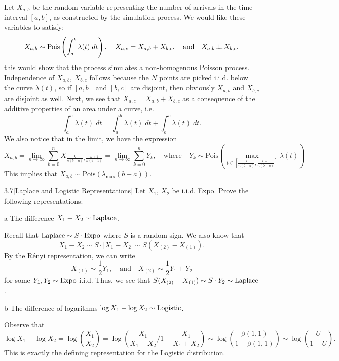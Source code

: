 \documentclass{pset}
\begin{document}
\begin{solution}
  Let $X_{a,b}$ be the random variable representing the number of arrivals in the time interval $[a,b]$, as constructed by the simulation process. We would like these variables to satisfy:
  \[X_{a,b} \sim \textrm{Pois}\left(\int_a^b \lambda(t) \;dt\right),\quad X_{a,c}=X_{a,b}+X_{b,c},\quad\textrm{and} \quad X_{a,b}\!\perp\!\!\!\perp\! X_{b, c},\]
  this would show that the process simulates a non-homogenous Poisson process. Independence of $X_{a,b}$, $X_{b,c}$ follows because the $N$ points are picked i.i.d. below the curve $\lambda(t)$, so if $[a,b]$ and $[b,c]$ are disjoint, then obviously $X_{a,b}$ and $X_{b,c}$ are disjoint as well. Next, we see that $X_{a,c} = X_{a,b} + X_{b,c}$ as a consequence of the additive properties of an area under a curve, i.e.
  \[
    \int_{a}^c \lambda(t)\;dt = \int_a^b \lambda(t)\;dt + \int_b^c \lambda(t)\;dt.
  \]
  We also notice that in the limit, we have the expression
  \[
    X_{a,b} = \lim_{n\to \infty} \sum^n_{k=0} X_{\frac{k}{n(b-a)}, \frac{k+1}{n(b-1)}} = \lim_{n\to \infty} \sum^n_{k=0} Y_k,\quad \textrm{where}\quad Y_k\sim \textrm{Pois}\left(\max_{t\in \left[\frac{k}{n(b-a)}, \frac{k+1}{n(b-a)}\right]}\lambda(t)\right)
  \]
  This implies that $X_{a,b}\sim \textrm{Pois}(\lambda_{\textrm{max}} ( b-a))$.
\end{solution}

\begin{problem}{3.7}[Laplace and Logistic Representations]
  Let $X_1$, $X_2$ be i.i.d. Expo. Prove the following representations:
\end{problem}

\begin{parts}
  \begin{part}{a}
    The difference $X_1 - X_2 \sim \textrm{Laplace}$.
  \end{part}

  Recall that $\textrm{Laplace}\sim S\cdot \textrm{Expo}$ where $S$ is a random sign. We also know that
  \[X_1 - X_2 \sim S\cdot | X_1 - X_2 | \sim S(X_{(2)} - X_{(1)}).\]
  By the R\'enyi representation, we can write
  \[ X_{(1)}\sim \frac{1}{2}Y_1,\quad\textrm{and}\quad X_{(2)} \sim \frac{1}{2}Y_1 + Y_2\]
  for some $Y_1, Y_2\sim \textrm{Expo}$ i.i.d. Thus, we see that $S(X_{(2)}-X_{(1)})\sim S \cdot Y_2 \sim \textrm{Laplace}$.

  \begin{part}{b}
    The difference of logarithms $\log X_1 - \log X_2 \sim \textrm{Logistic}$.
  \end{part}

  Observe that
  \[
    \log X_1 - \log X_2 = \log\left(\frac{X_1}{X_2}\right) = \log\left(\frac{X_1}{X_1 + X_2} \bigg/ 1-\frac{X_1}{X_1 + X_2}\right) \sim \log\left(\frac{\beta(1, 1)}{1-\beta(1,1)}\right)\sim \log\left(\frac{U}{1-U}\right).
  \]
  This is exactly the defining representation for the Logistic distribution.
\end{parts}
\end{document}
